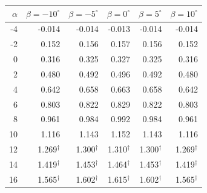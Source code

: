 \begin{tabular}{rrrrrr}
  \hline
  $\alpha$ & $\beta=-10^\circ$ & $\beta=-5^\circ$ & $\beta=0^\circ$ & $\beta=5^\circ$ & $\beta=10^\circ$ \\
  \hline
     -4 & -0.014 & -0.014 & -0.013 & -0.014 & -0.014 \\
     -2 & 0.152 & 0.156 & 0.157 & 0.156 & 0.152 \\
      0 & 0.316 & 0.325 & 0.327 & 0.325 & 0.316 \\
      2 & 0.480 & 0.492 & 0.496 & 0.492 & 0.480 \\
      4 & 0.642 & 0.658 & 0.663 & 0.658 & 0.642 \\
      6 & 0.803 & 0.822 & 0.829 & 0.822 & 0.803 \\
      8 & 0.961 & 0.984 & 0.992 & 0.984 & 0.961 \\
     10 & 1.116 & 1.143 & 1.152 & 1.143 & 1.116 \\
     12 & 1.269$^\dagger$ & 1.300$^\dagger$ & 1.310$^\dagger$ & 1.300$^\dagger$ & 1.269$^\dagger$ \\
     14 & 1.419$^\dagger$ & 1.453$^\dagger$ & 1.464$^\dagger$ & 1.453$^\dagger$ & 1.419$^\dagger$ \\
     16 & 1.565$^\dagger$ & 1.602$^\dagger$ & 1.615$^\dagger$ & 1.602$^\dagger$ & 1.565$^\dagger$ \\
  \hline
\end{tabular}
